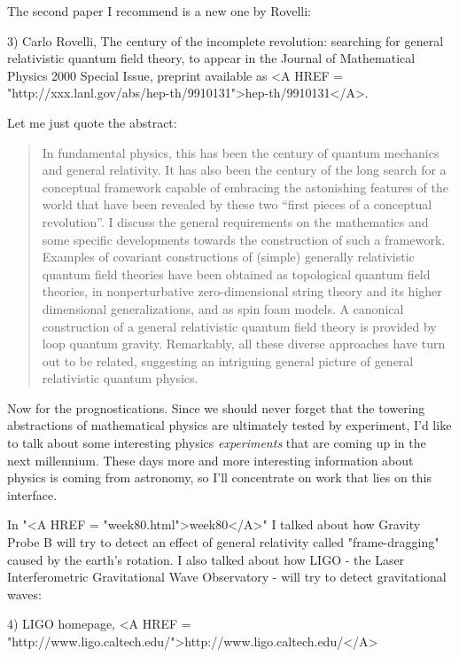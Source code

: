 The second paper I recommend is a new one by Rovelli:

3) Carlo Rovelli, The century of the incomplete revolution: searching 
for general relativistic quantum field theory, to appear in the
Journal of Mathematical Physics 2000 Special Issue, preprint available
as <A HREF = "http://xxx.lanl.gov/abs/hep-th/9910131">hep-th/9910131</A>.  

Let me just quote the abstract:

\begin{quote}
     In fundamental physics, this has been the century of quantum 
     mechanics and general relativity.  It has also been the century 
     of the long search for a conceptual framework capable of embracing 
     the astonishing features of the world that have been revealed by 
     these two ``first pieces of a conceptual revolution''.  I discuss 
     the general requirements on the mathematics and some specific 
     developments towards the construction of such a framework.  Examples 
     of covariant constructions of (simple) generally relativistic 
     quantum field theories have been obtained as topological quantum 
     field theories, in nonperturbative zero-dimensional string theory 
     and its higher dimensional generalizations, and as spin foam models. 
     A canonical construction of a general relativistic quantum field 
     theory is provided by loop quantum gravity.  Remarkably, all these 
     diverse approaches have turn out to be related, suggesting an 
     intriguing general picture of general relativistic quantum physics.

\end{quote}
Now for the prognostications.  Since we should never forget that the towering
abstractions of mathematical physics are ultimately tested by experiment, 
I'd like to talk about some interesting physics \emph{experiments} that are 
coming up in the next millennium.  These days more and more interesting
information about physics is coming from astronomy, so I'll concentrate
on work that lies on this interface.

In "<A HREF = "week80.html">week80</A>" I talked about how Gravity Probe B will try to detect an
effect of general relativity called "frame-dragging" caused by the
earth's rotation.   I also talked about how LIGO - the Laser 
Interferometric Gravitational Wave Observatory - will try to detect 
gravitational waves:

4) LIGO homepage, <A HREF = "http://www.ligo.caltech.edu/">http://www.ligo.caltech.edu/</A>  

